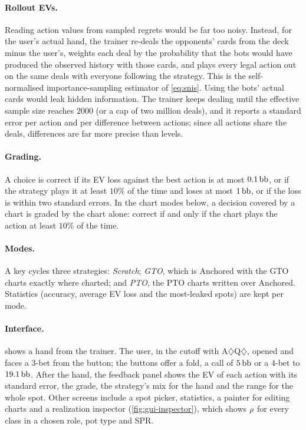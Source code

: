 \paragraph{Rollout EVs.} Reading action values from sampled regrets would be far too noisy. Instead, for the user's actual hand, the trainer re-deals the opponents' cards from the deck minus the user's, weights each deal by the probability that the bots would have produced the observed history with those cards, and plays every legal action out on the same deals with everyone following the strategy. This is the self-normalised importance-sampling estimator of \cref{eq:snis}. Using the bots' actual cards would leak hidden information. The trainer keeps dealing until the effective sample size reaches $2000$ (or a cap of two million deals), and it reports a standard error per action and per difference between actions; since all actions share the deals, differences are far more precise than levels.

\paragraph{Grading.} A choice is correct if its EV loss against the best action is at most $0.1\,\mathrm{bb}$, or if the strategy plays it at least $10\%$ of the time and loses at most $1\,\mathrm{bb}$, or if the loss is within two standard errors. In the chart modes below, a decision covered by a chart is graded by the chart alone: correct if and only if the chart plays the action at least $10\%$ of the time.

\paragraph{Modes.} A key cycles three strategies: \emph{Scratch}; \emph{GTO}, which is Anchored with the GTO charts exactly where charted; and \emph{PTO}, the PTO charts written over Anchored. Statistics (accuracy, average EV loss and the most-leaked spots) are kept per mode.

\paragraph{Interface.}  shows a hand from the trainer. The user, in the cutoff with A$\diamondsuit$Q$\diamondsuit$, opened and faces a 3-bet from the button; the buttons offer a fold, a call of $5\,\mathrm{bb}$ or a 4-bet to $19.1\,\mathrm{bb}$. After the hand, the feedback panel shows the EV of each action with its standard error, the grade, the strategy's mix for the hand and the range for the whole spot. Other screens include a spot picker, statistics, a painter for editing charts and a realization inspector (\cref{fig:gui-inspector}), which shows $\rho$ for every class in a chosen role, pot type and SPR.


